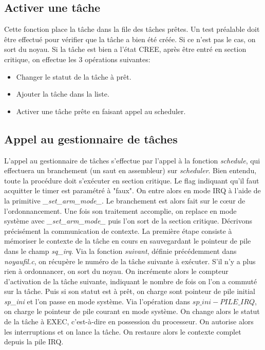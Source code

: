 \subsection{Activer une tâche}
Cette fonction place la tâche dans la file des tâches prêtes.
Un test préalable doit être effectué pour vérifier que la tâche a bien été créée. Si ce n'est pas le cas, on sort du noyau. Si la tâche est bien a l'état CREE, après être entré en section critique, on effectue les 3 opérations suivantes:
\begin{itemize}
    \item Changer le statut de la tâche à prêt.
    \item Ajouter la tâche dans la liste.
    \item Activer une tâche prête en faisant appel au scheduler.
\end{itemize}
%

\subsection{Appel au gestionnaire de tâches}
L'appel au gestionnaire de tâches s'effectue par l'appel à la fonction \textit{schedule}, qui effectuera un branchement (un saut en assembleur) sur \textit{scheduler}.
Bien entendu, toute la procédure doit s'exécuter en section critique. Le flag indiquant qu'il faut acquitter le timer est paramétré à "faux". On entre alors en mode IRQ à l'aide de la primitive \textit{\_set\_arm\_mode\_}. Le branchement est alors fait sur le cœur de l'ordonnancement. Une fois son traitement accomplie, on replace en mode système avec \textit{\_set\_arm\_mode\_} puis l'on sort de la section critique.
Décrivons précisément la communication de contexte. La première étape consiste à mémoriser le contexte de la tâche en cours en sauvegardant le pointeur de pile dans le champ \textit{sq\_irq}. Via la fonction \textit{suivant}, définie précédemment dans \textit{noyaufil.c}, on récupère le numéro de la tâche suivante à exécuter. S'il n'y a plus rien à ordonnancer, on sort du noyau. On incrémente alors le compteur d'activation de la tâche suivante, indiquant le nombre de fois on l'on a commuté sur la tâche. Puis si son statut est à prêt, on charge sont pointeur de pile initial \textit{sp\_ini} et l'on passe en mode système. Via l'opération dans $sp\_ini - PILE\_IRQ$, on charge le pointeur de pile courant en mode système. On change alors le statut de la tâche à EXEC, c'est-à-dire en possession du processeur. On autorise alors les interruptions et on lance la tâche. On restaure alors le contexte complet depuis la pile IRQ.
%
%

